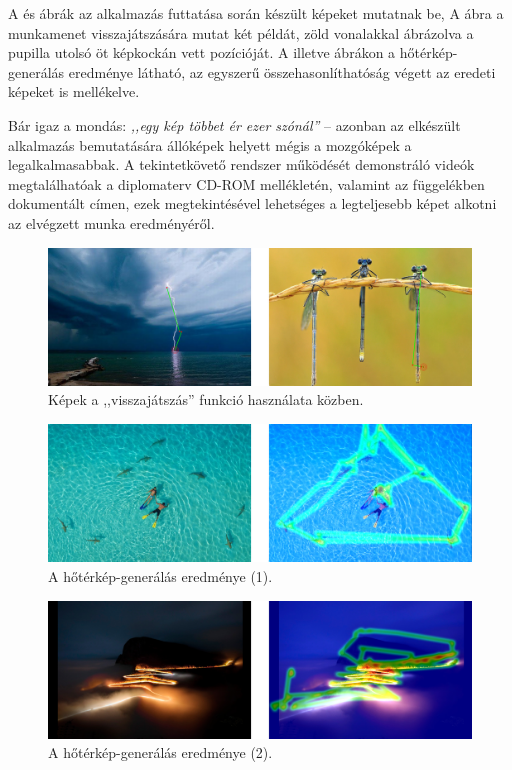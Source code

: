 \bigskip

A   és  ábrák az alkalmazás futtatása során készült képeket mutatnak be, A  ábra a munkamenet visszajátszására mutat két példát, zöld vonalakkal ábrázolva a pupilla utolsó öt képkockán vett pozícióját. A  illetve  ábrákon a hőtérkép-generálás eredménye látható, az egyszerű összehasonlíthatóság végett az eredeti képeket is mellékelve.

Bár igaz a mondás: \emph{,,egy kép többet ér ezer szónál''} -- azonban az elkészült alkalmazás bemutatására állóképek helyett mégis a mozgóképek a legalkalmasabbak. A tekintetkövető rendszer működését demonstráló videók megtalálhatóak a diplomaterv CD-ROM mellékletén, valamint az  függelékben dokumentált címen, ezek megtekintésével lehetséges a legteljesebb képet alkotni az elvégzett munka eredményéről.

\newpage

\begin{figure}[!ht]
\vspace{65pt}
\centering
\includegraphics[width=150mm, keepaspectratio]{figures/vegleges_vonal.png}
\caption{Képek a ,,visszajátszás'' funkció használata közben.}
\label{fig:vegleges_vonal}
\end{figure}

\begin{figure}[!ht]
\centering
\includegraphics[width=150mm, keepaspectratio]{figures/vegleges_heat1.png}
\caption{A hőtérkép-generálás eredménye (1).}
\label{fig:vegleges_heat1}
\end{figure}

\begin{figure}[!ht]
\centering
\includegraphics[width=150mm, keepaspectratio]{figures/vegleges_heat2.png}
\caption{A hőtérkép-generálás eredménye (2).}
\label{fig:vegleges_heat2}
\end{figure}